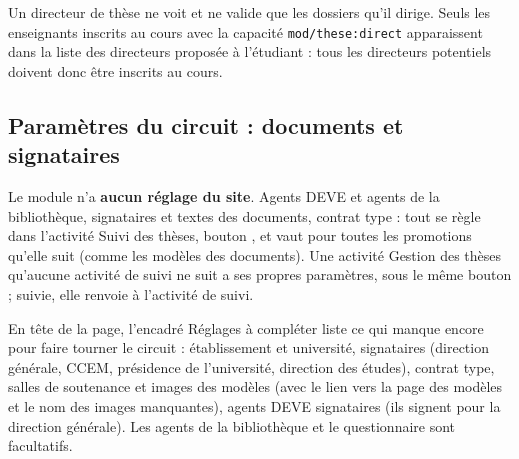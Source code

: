 \documentclass[11pt,a4paper]{article}
\begin{document}
\begin{astuce}
Un directeur de thèse ne voit et ne valide que les dossiers qu'il dirige. Seuls
les enseignants inscrits au cours avec la capacité \texttt{mod/these:direct}
apparaissent dans la liste des directeurs proposée à l'étudiant : tous les
directeurs potentiels doivent donc être inscrits au cours.
\end{astuce}

\subsection{Paramètres du circuit : documents et signataires}\label{sec:parametres}

Le module n'a \textbf{aucun réglage du site}. Agents DEVE et agents de la
bibliothèque, signataires et textes des documents, contrat type : tout se règle
dans l'activité \og Suivi des thèses\fg{}, bouton , et vaut pour toutes les promotions qu'elle suit (comme les modèles des
documents). Une activité \og Gestion des thèses\fg{} qu'aucune activité de suivi
ne suit a ses propres paramètres, sous le même bouton ; suivie, elle renvoie à
l'activité de suivi.

En tête de la page, l'encadré \og Réglages à compléter\fg{} liste ce qui
manque encore pour faire tourner le circuit : établissement et université,
signataires (direction générale, CCEM, présidence de l'université, direction
des études), contrat type, salles de soutenance et images des modèles (avec le
lien vers la page des modèles et le nom des images manquantes), agents DEVE
signataires (ils signent pour la direction générale). Les agents de la
bibliothèque et le questionnaire sont facultatifs.


\end{document}
